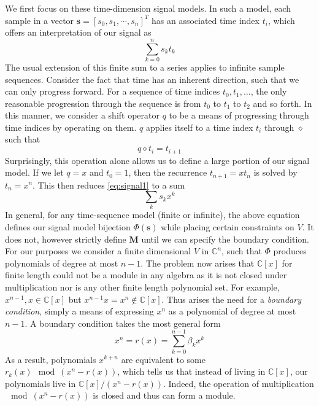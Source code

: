 \documentclass[12pt,technote]{IEEEtran}
\begin{document}
We first focus on these time-dimension signal models. In such a model, each sample in a vector $\mathbf{s} = [s_0, s_1, \cdots, s_n]^T$ has an associated time index $t_i$, which offers an interpretation of our signal as
\begin{equation}
    \sum_{k=0}^ns_kt_k\label{eq:signal1}
\end{equation}
The usual extension of this finite sum to a series applies to infinite sample sequences. Consider the fact that time has an inherent direction, such that we can only progress forward. For a sequence of time indices $t_0, t_1, \dots$, the only reasonable progression through the sequence is from $t_0$ to $t_1$ to $t_2$ and so forth. In this manner, we consider a shift operator $q$ to be a means of progressing through time indices by operating on them. $q$ applies itself to a time index $t_i$ through $\diamond$ such that 
\begin{equation*}
    q\diamond t_i = t_{i+1} 
\end{equation*}
Surprisingly, this operation alone allows us to define a large portion of our signal model. If we let $q = x$ and $t_0 = 1$, then the recurrence $t_{n+1} = xt_n$ is solved by $t_n = x^n$. This then reduces \eqref{eq:signal1} to a sum
\begin{equation*}
    \sum_{k}s_kx^k
\end{equation*}
In general, for any time-sequence model (finite or infinite), the above equation defines our signal model bijection $\Phi(\mathbf{s})$ while placing certain constraints on $V$. It does not, however strictly define $\mathbf{M}$ until we can specify the boundary condition. For our purposes we consider a finite dimensional $V$ in $\mathbb{C}^n$, such that $\Phi$ produces polynomials of degree at most $n-1$. The problem now arises that $\mathbb{C}[x]$ for finite length could not be a module in any algebra as it is not closed under multiplication nor is any other finite length polynomial set. For example, $x^{n-1},x\in \mathbb{C}[x]$ but $x^{n-1}x = x^n\not\in \mathbb{C}[x]$. Thus arises the need for a \textit{boundary condition}, simply a means of expressing $x^n$ as a polynomial of degree at most $n-1$. A boundary condition takes the most general form
\begin{equation}
    x^n = r(x) = \sum_{k=0}^{n-1}\beta_kx^k
\end{equation}
As a result, polynomials $x^{k+n}$ are equivalent to some $r_k(x)\mod{(x^n-r(x))}$, which tells us that instead of living in $\mathbb{C}[x]$, our polynomials live in $\mathbb{C}[x]/(x^n-r(x))$. Indeed, the operation of multiplication $\mod{(x^n-r(x))}$ is closed and thus can form a module.
\end{document}

